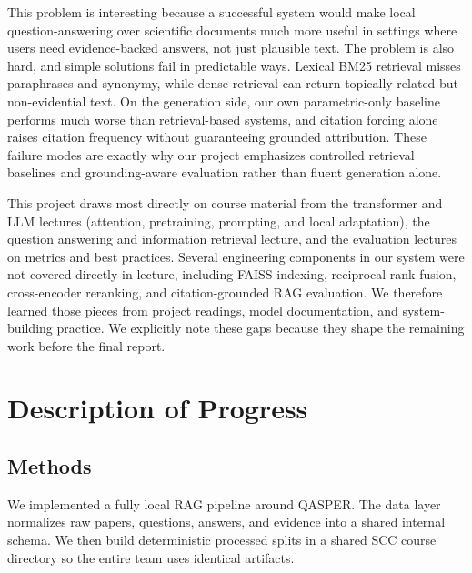 \documentclass[11pt]{article}
\begin{document}
This problem is interesting because a successful system would make local question-answering over scientific documents much more useful in settings where users need evidence-backed answers, not just plausible text. The problem is also hard, and simple solutions fail in predictable ways. Lexical BM25 retrieval misses paraphrases and synonymy, while dense retrieval can return topically related but non-evidential text. On the generation side, our own parametric-only baseline performs much worse than retrieval-based systems, and citation forcing alone raises citation frequency without guaranteeing grounded attribution. These failure modes are exactly why our project emphasizes controlled retrieval baselines and grounding-aware evaluation rather than fluent generation alone.

This project draws most directly on course material from the transformer and LLM lectures (attention, pretraining, prompting, and local adaptation), the question answering and information retrieval lecture, and the evaluation lectures on metrics and best practices. Several engineering components in our system were not covered directly in lecture, including FAISS indexing, reciprocal-rank fusion, cross-encoder reranking, and citation-grounded RAG evaluation. We therefore learned those pieces from project readings, model documentation, and system-building practice. We explicitly note these gaps because they shape the remaining work before the final report.

\section{Description of Progress}

\subsection{Methods}

We implemented a fully local RAG pipeline around QASPER. The data layer normalizes raw papers, questions, answers, and evidence into a shared internal schema. We then build deterministic processed splits in a shared SCC course directory so the entire team uses identical artifacts.
\end{document}
